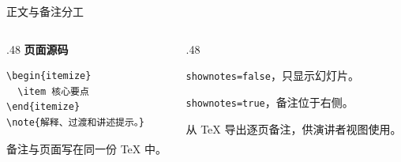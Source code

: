 \begin{frame}[fragile,label=demo-notes]{正文与备注分工}
  \begin{columns}[T,onlytextwidth]
    \begin{column}{.48\textwidth}
      \textbf{页面源码}
      \begin{verbatim}
\begin{itemize}
  \item 核心要点
\end{itemize}
\note{解释、过渡和讲述提示。}
      \end{verbatim}
      备注与页面写在同一份 TeX 中。
    \end{column}
    \begin{column}{.48\textwidth}
      \begin{description}
        \item[默认 PDF] \texttt{shownotes=false}，只显示幻灯片。
        \item[PDF 备注屏] \texttt{shownotes=true}，备注位于右侧。
        \item[PPTX 备注] 从 TeX 导出逐页备注，供演讲者视图使用。
      \end{description}
    \end{column}
  \end{columns}
\end{frame}
